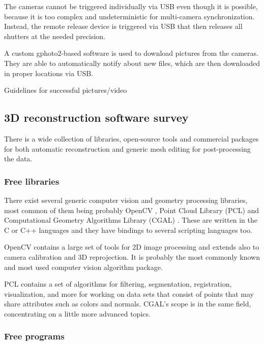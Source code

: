 The cameras cannot be triggered individually via USB even though it is possible, because it is too complex and undeterministic for multi-camera synchronization.
Instead, the remote release device is triggered via USB that then releases all shutters at the needed precision.

A custom gphoto2-based software is used to download pictures from the cameras. They are able to automatically notify about new files, which are then downloaded in proper locations via USB.

Guidelines for successful pictures/video


\subsection{3D reconstruction software survey} %

 There is a wide collection of libraries, open-source tools and commercial packages for both automatic reconstruction and generic mesh editing for post-processing the data.

\subsubsection{Free libraries} %

There exist several generic computer vision and geometry processing libraries, most common of them being probably OpenCV \cite{opencv}, Point Cloud Library (PCL) \cite{pcl} and Computational Geometry Algorithms Library (CGAL) \cite{cgal}. These are written in the C or C++ languages and they have bindings to several scripting languages too.

OpenCV contains a large set of tools for 2D image processing and extends also to camera calibration and 3D reprojection.
It is probably the most commonly known and most used computer vision algorithm package.

PCL contains a set of algorithms for filtering, segmentation, registration, visualization, and more for working on data sets that consist of points that may share attributes such as colors and normals. CGAL's scope is in the same field, concentrating on a little more advanced topics.


\subsubsection{Free programs} %

